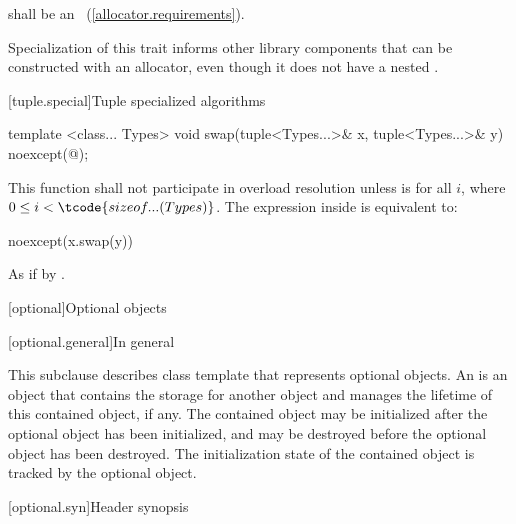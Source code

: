 \begin{itemdescr}
\pnum
\requires {} shall be an ~(\ref{allocator.requirements}).

\pnum
\begin{note} Specialization of this trait informs other library components that
 can be constructed with an allocator, even though it does not have
a nested . \end{note}
\end{itemdescr}

[tuple.special]{Tuple specialized algorithms}

%
\begin{itemdecl}
template <class... Types>
  void swap(tuple<Types...>& x, tuple<Types...>& y) noexcept(@\seebelow@);
\end{itemdecl}

\begin{itemdescr}
\pnum
\remarks This function shall not participate in overload resolution
unless  is 
for all $i$, where $0 \leq i < \tcode{sizeof...(Types)}$.
The expression inside  is equivalent to:

\begin{codeblock}
noexcept(x.swap(y))
\end{codeblock}

\pnum
\effects As if by .
\end{itemdescr}

[optional]{Optional objects}

[optional.general]{In general}

\pnum
This subclause describes class template  that represents
optional objects.
An  is an
object that contains the storage for another object and manages the lifetime of
this contained object, if any. The contained object may be initialized after
the optional object has been initialized, and may be destroyed before the
optional object has been destroyed. The initialization state of the contained
object is tracked by the optional object.

[optional.syn]{Header  synopsis}

